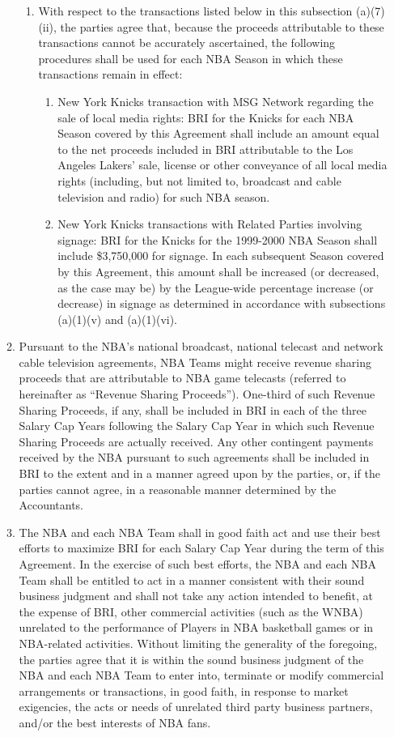 \documentclass[
]{book}
\providecommand{\tightlist}{%
  \setlength{\itemsep}{0pt}\setlength{\parskip}{0pt}}
\begin{document}
\begin{enumerate}
\begin{enumerate}
\begin{enumerate}
    \item
      With respect to the transactions listed below in this subsection (a)(7)(ii), the parties agree that, because the proceeds attributable to these transactions cannot be accurately ascertained, the following procedures shall be used for each NBA Season in which these transactions remain in effect:

      \begin{enumerate}
      \def\labelenumiv{(\Alph{enumiv})}
      \tightlist
      \item
        New York Knicks transaction with MSG Network regarding the sale of local media rights: BRI for the Knicks for each NBA Season covered by this Agreement shall include an amount equal to the net proceeds included in BRI attributable to the Los Angeles Lakers' sale, license or other conveyance of all local media rights (including, but not limited to, broadcast and cable television and radio) for such NBA season.
      \item
        New York Knicks transactions with Related Parties involving signage: BRI for the Knicks for the 1999-2000 NBA Season shall include \$3,750,000 for signage. In each subsequent Season covered by this Agreement, this amount shall be increased (or decreased, as the case may be) by the League-wide percentage increase (or decrease) in signage as determined in accordance with subsections (a)(1)(v) and (a)(1)(vi).
      \end{enumerate}
    \end{enumerate}
  \item
    Pursuant to the NBA's national broadcast, national telecast and network cable television agreements, NBA Teams might receive revenue sharing proceeds that are attributable to NBA game telecasts (referred to hereinafter as ``Revenue Sharing Proceeds''). One-third of such Revenue Sharing Proceeds, if any, shall be included in BRI in each of the three Salary Cap Years following the Salary Cap Year in which such Revenue Sharing Proceeds are actually received. Any other contingent payments received by the NBA pursuant to such agreements shall be included in BRI to the extent and in a manner agreed upon by the parties, or, if the parties cannot agree, in a reasonable manner determined by the Accountants.
  \item
    The NBA and each NBA Team shall in good faith act and use their best efforts to maximize BRI for each Salary Cap Year during the term of this Agreement. In the exercise of such best efforts, the NBA and each NBA Team shall be entitled to act in a manner consistent with their sound business judgment and shall not take any action intended to benefit, at the expense of BRI, other commercial activities (such as the WNBA) unrelated to the performance of Players in NBA basketball games or in NBA-related activities. Without limiting the generality of the foregoing, the parties agree that it is within the sound business judgment of the NBA and each NBA Team to enter into, terminate or modify commercial arrangements or transactions, in good faith, in response to market exigencies, the acts or needs of unrelated third party business partners, and/or the best interests of NBA fans.

\end{enumerate}
\end{enumerate}
\end{document}
